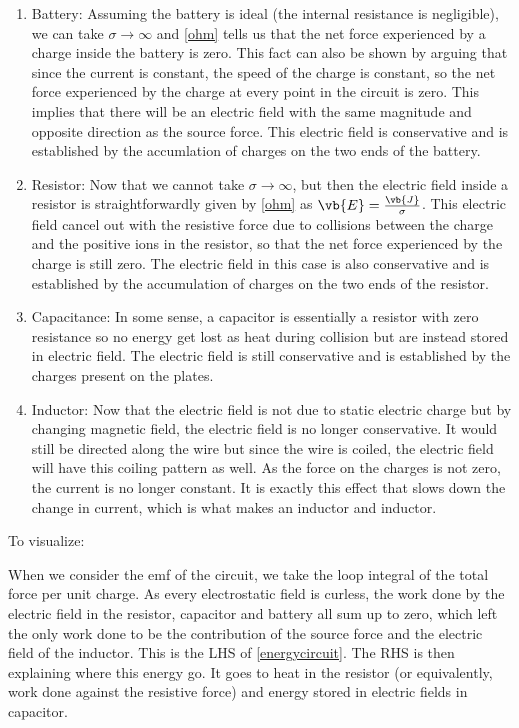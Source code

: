 \documentclass[english,a4paper,12pt]{report}
\begin{document}
\begin{enumerate}
    \item Battery: Assuming the battery is ideal (\ie the internal resistance is negligible), we can take \(\sigma \rightarrow \infty\) and \cref{ohm} tells us that the net force experienced by a charge inside the battery is zero. This fact can also be shown by arguing that since the current is constant, the speed of the charge is constant, so the net force experienced by the charge at every point in the circuit is zero. This implies that there will be an electric field with the same magnitude and opposite direction as the source force. This electric field is conservative and is established by the accumlation of charges on the two ends of the battery.
    \item Resistor: Now that we cannot take \(\sigma \rightarrow \infty\), but then the electric field inside a resistor is straightforwardly given by \cref{ohm} as \(\vb{E} = \frac{\vb{J} }{\sigma } \). This electric field cancel out with the resistive force due to collisions between the charge and the positive ions in the resistor, so that the net force experienced by the charge is still zero. The electric field in this case is also conservative and is established by the accumulation of charges on the two ends of the resistor.
    \item Capacitance: In some sense, a capacitor is essentially a resistor with zero resistance so no energy get lost as heat during collision but are instead stored in electric field. The electric field is still conservative and is established by the charges present on the plates. 
    \item Inductor: Now that the electric field is not due to static electric charge but by changing magnetic field, the electric field is no longer conservative. It would still be directed along the wire but since the wire is coiled, the electric field will have this coiling pattern as well. As the force on the charges is not zero, the current is no longer constant. It is exactly this effect that slows down the change in current, which is what makes an inductor and inductor.
\end{enumerate}

To visualize:

When we consider the emf of the circuit, we take the loop integral of the total force per unit charge. As every electrostatic field is curless, the work done by the electric field in the resistor, capacitor and battery all sum up to zero, which left the only work done to be the contribution of the source force and the electric field of the inductor. This is the LHS of \cref{energycircuit}. The RHS is then explaining where this energy go. It goes to heat in the resistor (or equivalently, work done against the resistive force) and energy stored in electric fields in capacitor. 
\end{document}
